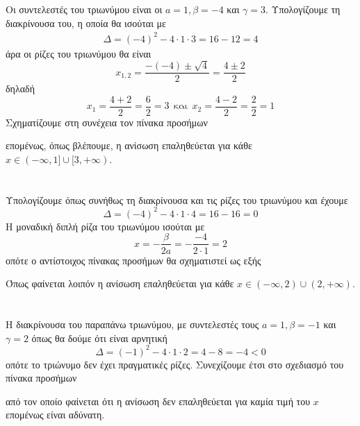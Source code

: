 Οι συντελεστές του τριωνύμου είναι οι $ a=1,\beta=-4 $ και $ \gamma=3 $. Υπολογίζουμε τη διακρίνουσα του, η οποία θα ισούται με
\begin{gather*}
\varDelta=(-4)^2-4\cdot 1\cdot 3=16-12=4
\end{gather*}
άρα οι ρίζες του τριωνύμου θα είναι 
\[ x_{1,2}=\frac{-(-4)\pm \sqrt{4}}{2}=\frac{4\pm 2}{2} \]
δηλαδή
\[ x_1=\frac{4+2}{2}=\frac{6}{2}=3\ \ \textrm{και}\ \ x_2=\frac{4-2}{2}=\frac{2}{2}=1 \]
Σχηματίζουμε στη συνέχεια τον πίνακα προσήμων
\begin{center}
\end{center}
επομένως, όπως βλέπουμε, η ανίσωση επαληθεύεται για κάθε $ x\in (-\infty,1]\cup[3,+\infty) $.\\\\
\lysh\\
Υπολογίζουμε όπως συνήθως τη διακρίνουσα και τις ρίζες του τριωνύμου και έχουμε
\[ \varDelta=(-4)^2-4\cdot 1\cdot 4=16-16=0 \]
Η μοναδική διπλή ρίζα του τριωνύμου ισούται με
\[ x=-\frac{\beta}{2a}=-\frac{-4}{2\cdot 1}=2 \]
οπότε ο αντίστοιχος πίνακας προσήμων θα σχηματιστεί ως εξής
\begin{center}
\end{center}
Όπως φαίνεται λοιπόν η ανίσωση επαληθεύεται για κάθε $ x\in(-\infty,2)\cup(2,+\infty) $.\\\\
\lysh\\
Η διακρίνουσα του παραπάνω τριωνύμου, με συντελεστές τους $ a=1,\beta=-1 $ και $ \gamma=2 $ όπως θα δούμε ότι είναι αρνητική
\[ \varDelta=(-1)^2-4\cdot 1\cdot 2=4-8=-4<0 \]
οπότε το τριώνυμο δεν έχει πραγματικές ρίζες. Συνεχίζουμε έτσι στο σχεδιασμό του πίνακα προσήμων
\begin{center}
\end{center}
από τον οποίο φαίνεται ότι η ανίσωση δεν επαληθεύεται για καμία τιμή του $ x $ επομένως είναι αδύνατη.\\
